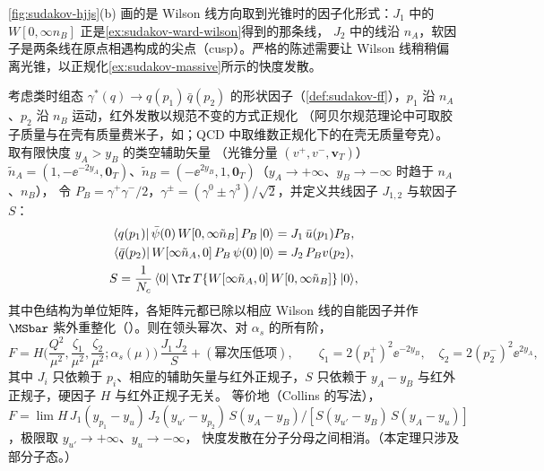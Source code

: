 \cref{fig:sudakov-hjjs}(b) 画的是 Wilson 线方向取到光锥时的因子化形式：$J_1$ 中的 $W[0,\infty n_B]$ 正是\cref{ex:sudakov-ward-wilson}得到的那条线，
$J_2$ 中的线沿 $n_A$，软因子是两条线在原点相遇构成的尖点（cusp）。严格的陈述需要让 Wilson 线稍稍偏离光锥，以正规化\cref{ex:sudakov-massive}所示的快度发散。

\begin{theorem}\label{thm:sudakov-factorization}
考虑类时组态 $\gamma^*(q)\to q(p_1)\,\bar q(p_2)$ 的形状因子（\cref{def:sudakov-ff}），$p_1$ 沿 $n_A$、$p_2$ 沿 $n_B$ 运动，红外发散以规范不变的方式正规化
（阿贝尔规范理论中可取胶子质量与在壳有质量费米子，如\cite[第~10~章]{Collins2011}；QCD 中取维数正规化下的在壳无质量夸克）。取有限快度 $y_A>y_B$ 的类空辅助矢量
（光锥分量 $(v^+,v^-,\mathbf v_T)$）$\tilde n_A=(1,-\ee^{-2y_A},\mathbf 0_T)$、$\tilde n_B=(-\ee^{2y_B},1,\mathbf 0_T)$（$y_A\to+\infty$、$y_B\to-\infty$ 时趋于 $n_A$、$n_B$），
令 $P_B=\gamma^+\gamma^-/2$，$\gamma^\pm=(\gamma^0\pm\gamma^3)/\sqrt2$，并定义共线因子 $J_{1,2}$ 与软因子 $S$：
\begin{equation}\label{eq:sudakov-JS}
\begin{gathered}
\langle q(p_1)|\,\bar\psi(0)\,W[0,\infty\tilde n_B]\,P_B\,|0\rangle=J_1\,\bar u(p_1)P_B,\\
\langle\bar q(p_2)|\,W[\infty\tilde n_A,0]\,P_B\,\psi(0)\,|0\rangle=J_2\,P_Bv(p_2),\\
S=\frac1{N_c}\,\langle0|\,\Tr\,T\{W[\infty\tilde n_A,0]\,W[0,\infty\tilde n_B]\}\,|0\rangle ,
\end{gathered}
\end{equation}
其中色结构为单位矩阵，各矩阵元都已除以相应 Wilson 线的自能因子并作 $\MSbar$ 紫外重整化（\cite[式~(10.89)--(10.92)、(10.101)]{Collins2011}）。则在领头幂次、对 $\alpha_s$ 的所有阶，
\begin{equation}\label{eq:sudakov-fact}
F=H\Big(\frac{Q^2}{\mu^2},\frac{\zeta_1}{\mu^2},\frac{\zeta_2}{\mu^2};\alpha_s(\mu)\Big)\,\frac{J_1\,J_2}{S}+(\text{幂次压低项}),\qquad
\zeta_1=2(p_1^+)^2\ee^{-2y_B},\quad\zeta_2=2(p_2^-)^2\ee^{2y_A},
\end{equation}
其中 $J_i$ 只依赖于 $p_i$、相应的辅助矢量与红外正规子，$S$ 只依赖于 $y_A-y_B$ 与红外正规子，硬因子 $H$ 与红外正规子无关。
等价地（Collins 的写法），$F=\lim H\,J_1(y_{p_1}-y_{u})\,J_2(y_{u'}-y_{p_2})\,S(y_A-y_B)/[S(y_{u'}-y_B)\,S(y_A-y_u)]$，极限取 $y_{u'}\to+\infty$、$y_u\to-\infty$，
快度发散在分子分母之间相消\cite[式~(10.109)]{Collins2011}。（本定理只涉及部分子态。）
\end{theorem}

